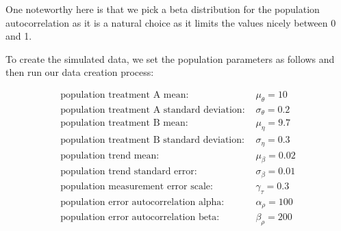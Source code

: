 \documentclass[12pt,a4paper,leqno]{report}
\theoremstyle{plain}
\theoremstyle{definition}
\theoremstyle{remark}
\begin{document}

One noteworthy here is that we pick a beta distribution for the population
autocorrelation as it is a natural choice as it limits the values nicely between 0 and 1.

To create the simulated data, we set the population parameters as follows and then run
our data creation process:

\begin{align}\label{populationparameters}
    \text{population treatment A mean: } & \mu_{\theta} = 10 \nonumber \\
    \text{population treatment A standard deviation: } & \sigma_{\theta} = 0.2 \nonumber \\
    \text{population treatment B mean: } & \mu_{\eta} = 9.7 \nonumber \\
    \text{population treatment B standard deviation: } & \sigma_{\eta} = 0.3 \nonumber \\
    \text{population trend mean: } & \mu_{\beta} = 0.02 \nonumber \\
    \text{population trend standard error: } & \sigma_{\beta} = 0.01 \nonumber \\
    \text{population measurement error scale: } & \gamma_{\tau} = 0.3 \nonumber \\
    \text{population error autocorrelation alpha: } & \alpha_{\rho} = 100 \nonumber \\
    \text{population error autocorrelation beta: } & \beta_{\rho} = 200 \nonumber
\end{align}
\end{document}
